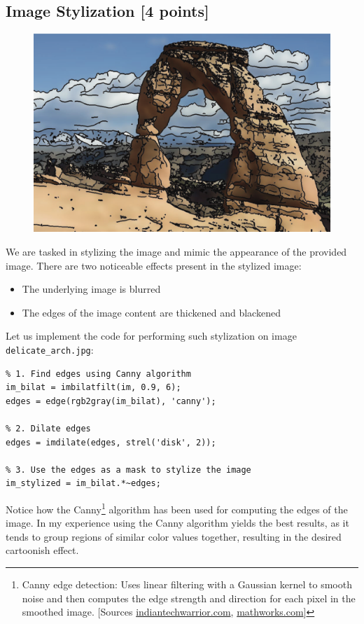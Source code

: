 \documentclass[tikz,14pt,fleqn]{article}
\begin{document}
\subsection{Image Stylization [4 points]}
\begin{figure}
    \centering
    \vspace*{-0.5cm}
    \includegraphics[width=1\linewidth]{fig/6.1.goal.png}
    \label{fig:1.1}
\end{figure}
We are tasked in stylizing the image and mimic the appearance of the provided image. There are two noticeable effects present in the stylized image:
\begin{itemize}
    \item The underlying image is blurred
    \item The edges of the image content are thickened and blackened
\end{itemize}
Let us implement the code for performing such stylization on image \verb|delicate_arch.jpg|:
\vspace*{-1cm}
\begin{verbatim}
% 1. Find edges using Canny algorithm
im_bilat = imbilatfilt(im, 0.9, 6);
edges = edge(rgb2gray(im_bilat), 'canny');

% 2. Dilate edges
edges = imdilate(edges, strel('disk', 2));

% 3. Use the edges as a mask to stylize the image
im_stylized = im_bilat.*~edges;
\end{verbatim}
Notice how the Canny\footnote{Canny edge detection: Uses linear filtering with a Gaussian kernel to smooth noise and then computes the edge strength and direction for each pixel in the smoothed image. [Sources \href{https://indiantechwarrior.com/canny-edge-detection-for-image-processing/}{indiantechwarrior.com}, \href{https://ch.mathworks.com/help/images/ref/edge.html}{mathworks.com}]} algorithm has been used for computing the edges of the image. In my experience using the Canny algorithm yields the best results, as it tends to group regions of similar color values together, resulting in the desired cartoonish effect.
\end{document}
